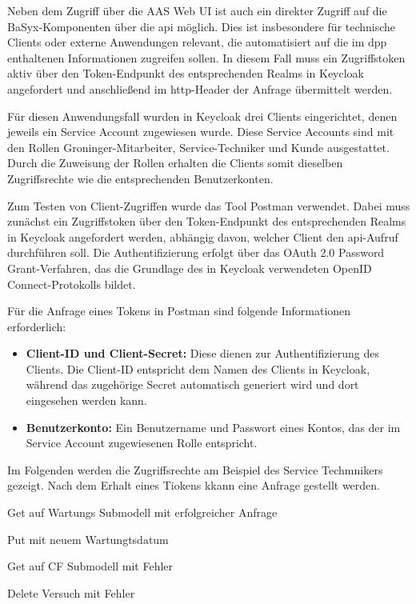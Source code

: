 Neben dem Zugriff über die AAS Web UI ist auch ein direkter Zugriff auf die BaSyx-Komponenten über die \acs{api} möglich.
Dies ist insbesondere für technische Clients oder externe Anwendungen relevant, die automatisiert auf die im \acs{dpp} enthaltenen Informationen zugreifen sollen.
In diesem Fall muss ein Zugriffstoken aktiv über den Token-Endpunkt des entsprechenden Realms in Keycloak angefordert und anschließend im \acs{http}-Header der Anfrage übermittelt werden.

Für diesen Anwendungsfall wurden in Keycloak drei Clients eingerichtet, denen jeweils ein Service Account zugewiesen wurde.
Diese Service Accounts sind mit den Rollen Groninger-Mitarbeiter, Service-Techniker und Kunde ausgestattet.
Durch die Zuweisung der Rollen erhalten die Clients somit dieselben Zugriffsrechte wie die entsprechenden Benutzerkonten.

Zum Testen von Client-Zugriffen wurde das Tool Postman verwendet.
Dabei muss zunächst ein Zugriffstoken über den Token-Endpunkt des entsprechenden Realms in Keycloak angefordert werden, abhängig davon, welcher Client den \acs{api}-Aufruf durchführen soll.
Die Authentifizierung erfolgt über das OAuth 2.0 Password Grant-Verfahren, das die Grundlage des in Keycloak verwendeten OpenID Connect-Protokolls bildet.

Für die Anfrage eines Tokens in Postman sind folgende Informationen erforderlich:

\begin{itemize}[noitemsep, leftmargin=*]
    \item \textbf{Client-ID und Client-Secret:} Diese dienen zur Authentifizierung des Clients. Die Client-ID entspricht dem Namen des Clients in Keycloak, während das zugehörige Secret automatisch generiert wird und dort eingesehen werden kann.
    \item \textbf{Benutzerkonto:} Ein Benutzername und Passwort eines Kontos, das der im Service Account zugewiesenen Rolle entspricht.
\end{itemize}

Im Folgenden werden die Zugriffsrechte am Beispiel des Service Techmnikers gezeigt.
Nach dem Erhalt eines Tiokens kkann eine Anfrage gestellt werden.

Get auf Wartungs Submodell mit erfolgreicher Anfrage 

Put mit neuem Wartungtsdatum

Get auf CF Submodell mit Fehler

Delete Versuch mit Fehler


